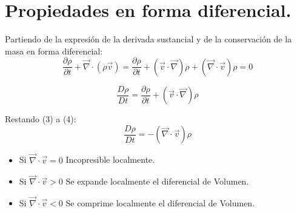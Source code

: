 \section{Propiedades en forma diferencial.}
Partiendo de la expresión de la derivada sustancial y de la conservación de la masa en forma diferencial:
\begin{equation} \label{eq:1}
	\frac{\partial \rho}{\partial t} +\vec{\nabla}\cdot\left(\rho\vec{v}\right)=\frac{\partial \rho}{\partial t} +\left(\vec{v}\cdot\vec{\nabla}\right)\rho+\left(\vec{\nabla}\cdot\vec{v}\right)\rho=0
\end{equation}

\begin{equation} \label{eq:4}
	\frac{D \rho}{D t}=\frac{ \partial \rho}{\partial t}+\left(\vec{v}\cdot\vec{\nabla}\right)\rho
\end{equation}

Restando (3) a (4):
\[\frac{D \rho}{D t}=-\left(\vec{\nabla}\cdot\vec{v}\right)\rho\]
\begin{itemize}
	\item Si $\vec{\nabla}\cdot\vec{v} =0 $ Incopresible localmente.
	\item Si $\vec{\nabla}\cdot\vec{v} >0$ Se expande localmente el diferencial de Volumen.
	\item Si $\vec{\nabla}\cdot\vec{v} <0$ Se comprime localmente el diferencial de Volumen.
\end{itemize}

